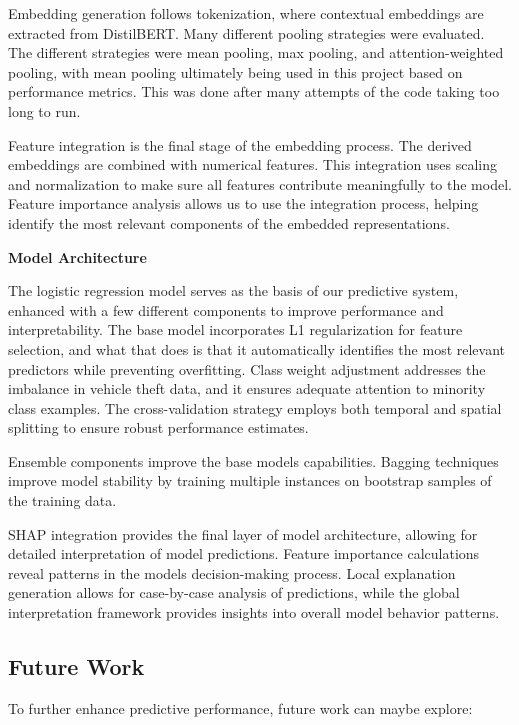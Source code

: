 \documentclass[
]{article}
\begin{document}
Embedding generation follows tokenization, where contextual embeddings
are extracted from DistilBERT. Many different pooling strategies were
evaluated. The different strategies were mean pooling, max pooling, and
attention-weighted pooling, with mean pooling ultimately being used in
this project based on performance metrics. This was done after many
attempts of the code taking too long to run.

Feature integration is the final stage of the embedding process. The
derived embeddings are combined with numerical features. This
integration uses scaling and normalization to make sure all features
contribute meaningfully to the model. Feature importance analysis allows
us to use the integration process, helping identify the most relevant
components of the embedded representations.

\textbf{Model Architecture}

The logistic regression model serves as the basis of our predictive
system, enhanced with a few different components to improve performance
and interpretability. The base model incorporates L1 regularization for
feature selection, and what that does is that it automatically
identifies the most relevant predictors while preventing overfitting.
Class weight adjustment addresses the imbalance in vehicle theft data,
and it ensures adequate attention to minority class examples. The
cross-validation strategy employs both temporal and spatial splitting to
ensure robust performance estimates.

Ensemble components improve the base model\textquotesingle s
capabilities. Bagging techniques improve model stability by training
multiple instances on bootstrap samples of the training data.

SHAP integration provides the final layer of model architecture,
allowing for detailed interpretation of model predictions. Feature
importance calculations reveal patterns in the model\textquotesingle s
decision-making process. Local explanation generation allows for
case-by-case analysis of predictions, while the global interpretation
framework provides insights into overall model behavior patterns.

\subsection{Future Work}\label{future-work}

To further enhance predictive performance, future work can maybe
explore:
\end{document}
